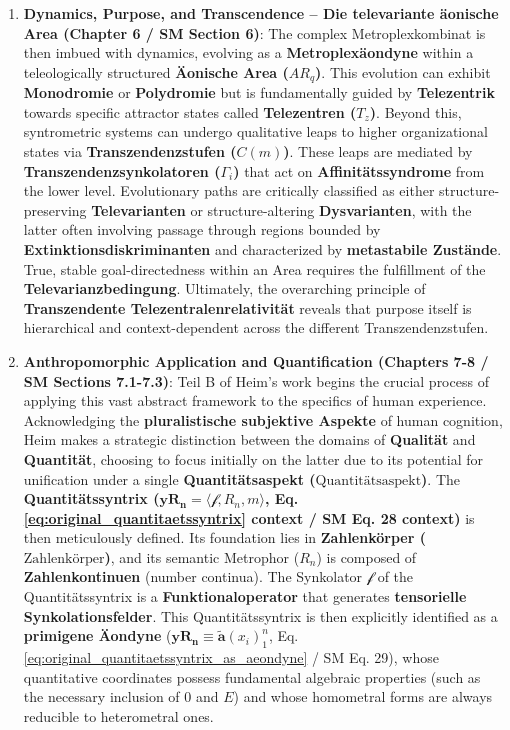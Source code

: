\documentclass[12pt]{article}
\newcommand{\synkolationsstufe}{m}
\newcommand{\telezentrum}{T_z}
\newcommand{\aeonischearea}{AR_q}
\newcommand{\transzendenzstufe}[1]{C(#1)}
\newcommand{\transzendenzsynkolator}{\Gamma_i}
\newcommand{\quantitaetsaspekt}{\text{Quantitätsaspekt}}
\newcommand{\quantitaetssyntrix}{\bm{yR_n}}
\newcommand{\zahlenkoerper}{\text{Zahlenkörper}}
\newcommand{\semantischermetrophor}{R_n}
\newcommand{\funktionaloperator}{\mathcal{f}}
\newcommand{\aeondynechaptereight}{\mathbf{\widetilde{a}}(x_i)^n_1}
\begin{document}
\begin{enumerate}
    \item \textbf{Dynamics, Purpose, and Transcendence – Die televariante äonische Area (Chapter 6 / SM Section 6)}: The complex Metroplexkombinat is then imbued with dynamics, evolving as a \textbf{Metroplexäondyne} within a teleologically structured \textbf{Äonische Area (\( \aeonischearea \))}. This evolution can exhibit \textbf{Monodromie} or \textbf{Polydromie} but is fundamentally guided by \textbf{Telezentrik} towards specific attractor states called \textbf{Telezentren (\( \telezentrum \))}. Beyond this, syntrometric systems can undergo qualitative leaps to higher organizational states via \textbf{Transzendenzstufen (\( \transzendenzstufe{m} \))}. These leaps are mediated by \textbf{Transzendenzsynkolatoren (\( \transzendenzsynkolator \))} that act on \textbf{Affinitätssyndrome} from the lower level. Evolutionary paths are critically classified as either structure-preserving \textbf{Televarianten} or structure-altering \textbf{Dysvarianten}, with the latter often involving passage through regions bounded by \textbf{Extinktionsdiskriminanten} and characterized by \textbf{metastabile Zustände}. True, stable goal-directedness within an Area requires the fulfillment of the \textbf{Televarianzbedingung}. Ultimately, the overarching principle of \textbf{Transzendente Telezentralenrelativität} reveals that purpose itself is hierarchical and context-dependent across the different Transzendenzstufen.

    \item \textbf{Anthropomorphic Application and Quantification (Chapters 7-8 / SM Sections 7.1-7.3)}: Teil B of Heim's work begins the crucial process of applying this vast abstract framework to the specifics of human experience. Acknowledging the \textbf{pluralistische subjektive Aspekte} of human cognition, Heim makes a strategic distinction between the domains of \textbf{Qualität} and \textbf{Quantität}, choosing to focus initially on the latter due to its potential for unification under a single \textbf{Quantitätsaspekt (\(\quantitaetsaspekt\))}. The \textbf{Quantitätssyntrix (\( \quantitaetssyntrix = \langle \funktionaloperator, \semantischermetrophor, \synkolationsstufe \rangle \), Eq. \eqref{eq:original_quantitaetssyntrix} context / SM Eq. 28 context)} is then meticulously defined. Its foundation lies in \textbf{Zahlenkörper (\(\zahlenkoerper\))}, and its semantic Metrophor (\( \semantischermetrophor \)) is composed of \textbf{Zahlenkontinuen} (number continua). The Synkolator \( \funktionaloperator \) of the Quantitätssyntrix is a \textbf{Funktionaloperator} that generates \textbf{tensorielle Synkolationsfelder}. This Quantitätssyntrix is then explicitly identified as a \textbf{primigene \"{A}ondyne} (\( \quantitaetssyntrix \equiv \aeondynechaptereight \), Eq. \eqref{eq:original_quantitaetssyntrix_as_aeondyne} / SM Eq. 29), whose quantitative coordinates possess fundamental algebraic properties (such as the necessary inclusion of \( 0 \) and \( E \)) and whose homometral forms are always reducible to heterometral ones.


\end{enumerate}
\end{document}
